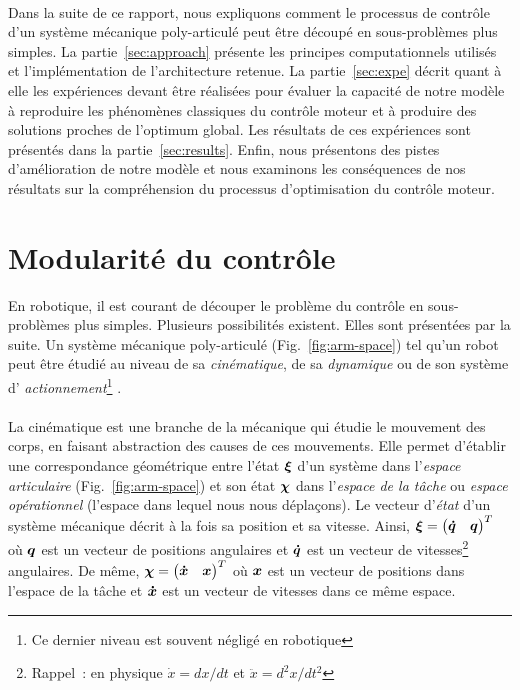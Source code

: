 \documentclass[pdftex,a4paper,11pt]{article}
\begin{document}
\paragraph{}
Dans la suite de ce rapport, nous expliquons comment le processus de contrôle d'un
système mécanique poly-articulé peut être découpé en sous-problèmes plus
simples.
La partie~\ref{sec:approach} présente les principes computationnels utilisés et
l'implémentation de l'architecture retenue.
La partie~\ref{sec:expe} décrit quant à elle les expériences devant être
réalisées pour évaluer la capacité de notre modèle à reproduire les phénomènes
classiques du contrôle moteur et à produire des solutions proches de l'optimum
global.
Les résultats de ces expériences sont présentés dans la partie~\ref{sec:results}.
Enfin, nous présentons des pistes d'amélioration de notre
modèle et nous examinons les conséquences de nos résultats sur la compréhension
du processus d'optimisation du contrôle moteur.


\section{Modularité du contrôle}
\label{sec:modularity}

En robotique, il est courant de découper le problème 
du contrôle en sous-problèmes plus simples.
Plusieurs possibilités existent. Elles sont présentées par la suite.
Un système mécanique poly-articulé (Fig.~\ref{fig:arm-space}) tel qu'un robot peut être étudié au niveau
de sa {\em cinématique}, de sa {\em dynamique} ou de son système d'{\em
actionnement}\footnote{Ce dernier niveau est souvent négligé en robotique}
\cite{siciliano2009robotics}.

\paragraph{}
La cinématique est une branche de la mécanique qui étudie le mouvement des
corps, en faisant abstraction des causes de ces mouvements.
Elle permet d'établir une correspondance géométrique
entre l'état $\boldsymbol{\xi}$ d'un système dans l'{\em espace articulaire} (Fig.~\ref{fig:arm-space}) et son
état $\boldsymbol{\chi}$ dans l'{\em espace de la tâche} ou {\em espace opérationnel}
(l'espace dans lequel nous nous déplaçons).
Le vecteur d'{\em état} d'un système mécanique décrit à la fois sa position et
sa vitesse. Ainsi, $\boldsymbol{\xi} = \begin{pmatrix} \boldsymbol{\dot{q}} & \boldsymbol{q} \end{pmatrix}^T$ où $\boldsymbol{q}$
est un vecteur de positions angulaires et $\boldsymbol{\dot{q}}$ est un vecteur de
vitesses\footnote{Rappel~: en physique $\dot{x}=dx/dt$ et $\ddot{x}=d^2x/dt^2$}
angulaires.  De même, $\boldsymbol{\chi} = \begin{pmatrix} \boldsymbol{\dot{x}} & \boldsymbol{x} \end{pmatrix}^T$ où
$\boldsymbol{x}$ est un vecteur de positions dans l'espace de la tâche et $\boldsymbol{\dot{x}}$ est un
vecteur de vitesses dans ce même espace.
\end{document}
